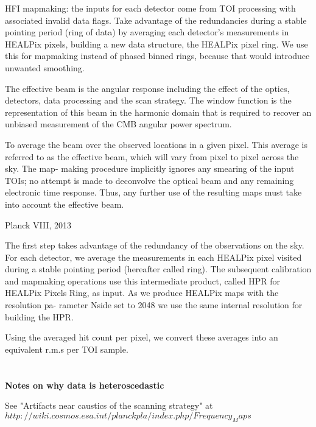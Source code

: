 \documentclass[a4paper, 11pt]{article}
\begin{document}
HFI mapmaking: the inputs for each detector come from TOI processing with associated invalid data flags. Take advantage of the redundancies during a stable pointing period (ring of data) by averaging each detector's measurements in HEALPix pixels, building a new data structure, the HEALPix pixel ring. We use this for mapmaking instead of phased binned rings, because that would introduce unwanted smoothing. 

The effective beam is the angular response including the effect of the optics, detectors, data processing and the scan strategy. The window function is the representation of this beam in the harmonic domain that is required to recover an unbiased measurement of the CMB angular power spectrum.

To average the beam over the observed locations in a given pixel. This average is referred to as the effective beam, which will vary from pixel to pixel across the sky. The map- making procedure implicitly ignores any smearing of the input TOIs; no attempt is made to deconvolve the optical beam and any remaining electronic time response. Thus, any further use of the resulting maps must take into account the effective beam.

Planck VIII, 2013

The first step takes advantage of the redundancy of the observations on the sky. For each detector, we average the measurements in each HEALPix pixel visited during a stable pointing period (hereafter called ring). The subsequent calibration and mapmaking operations use this intermediate product, called HPR for HEALPix Pixels Ring, as input. As we produce HEALPix maps with the resolution pa- rameter Nside set to 2048 we use the same internal resolution for building the HPR.

Using the averaged hit count per pixel, we convert these averages into an equivalent r.m.s per TOI sample. 



\paragraph{} \hspace{0pt} \\



\textbf{Notes on why data is heteroscedastic}

See "Artifacts near caustics of the scanning strategy" at \\ $http://wiki.cosmos.esa.int/planckpla/index.php/Frequency_Maps$
\end{document}
